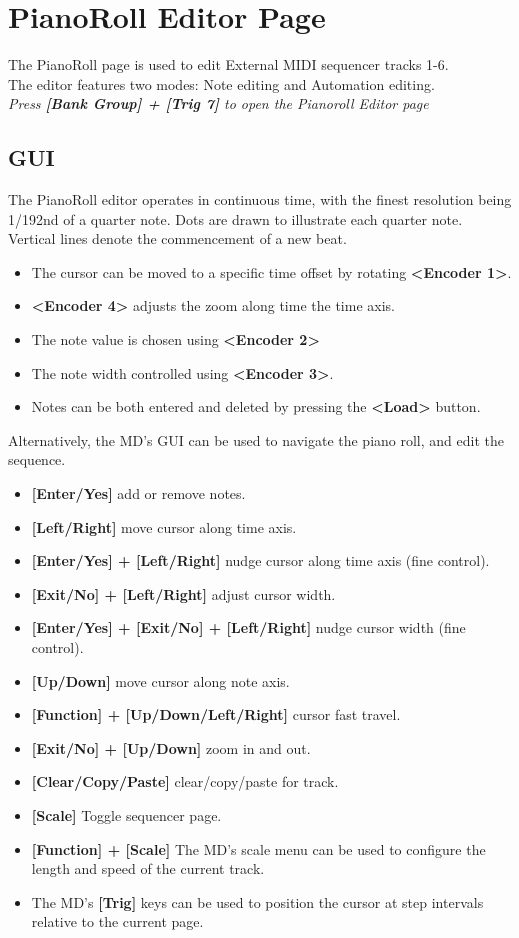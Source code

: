 \chapter{PianoRoll Editor Page}
The PianoRoll page is used to edit External MIDI sequencer tracks 1-6.\\
The editor features two modes: Note editing and Automation editing.
\\
\textit{Press \textbf{[Bank Group] + [Trig 7]} to open the Pianoroll Editor page}
\section{GUI}
The PianoRoll editor operates in continuous time, with the finest resolution being 1/192nd of a quarter note. Dots are drawn to illustrate each quarter note. Vertical lines denote the commencement of a new beat.
\newpage
\begin{itemize}
\item The cursor can be moved to a specific time offset by rotating \textbf{<Encoder 1>}. 
\item \textbf{<Encoder 4>} adjusts the zoom along time the time axis.
\item  The note value is chosen using \textbf{<Encoder 2>}
\item The note width controlled using \textbf{<Encoder 3>}. 
\item Notes can be both entered and deleted by pressing the \textbf{<Load>} button.
\end{itemize}
Alternatively, the MD's GUI can be used to navigate the piano roll, and edit the sequence.
\begin{itemize}
     \item \textbf{[Enter/Yes]} add or remove notes.
     \item \textbf{[Left/Right]} move cursor along time axis.
     \item \textbf{[Enter/Yes] + [Left/Right]} nudge cursor along time axis (fine control).
     \item \textbf{[Exit/No] + [Left/Right]} adjust cursor width.
     \item \textbf{[Enter/Yes] + [Exit/No] + [Left/Right]} nudge cursor width (fine control).
     \item \textbf{[Up/Down]} move cursor along note axis.
     \item \textbf{[Function] + [Up/Down/Left/Right]} cursor fast travel.
     \item \textbf{[Exit/No] + [Up/Down]} zoom in and out.
     \item \textbf{[Clear/Copy/Paste]} clear/copy/paste for track.
      \item \textbf{[Scale]} Toggle sequencer page.
     \item \textbf{[Function] + [Scale]} The MD's scale menu can be used to configure the length and speed of the current track.
     \item The MD's \textbf{[Trig]} keys can be used to position the cursor at step intervals relative to the current page.
\end{itemize}

